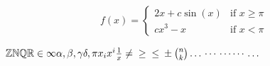 \documentclass{article}
\begin{document}
  \begin{equation}
    f(x) = \begin{cases}
    2x+c\sin(x) & \mbox{if } x\geq\pi \\
    cx^3-x & \mbox{if } x<\pi
    \end{cases}
    \end{equation}


$
\mathbb{Z}\\
\mathbb{N}\\
\mathbb{Q}\\
\mathbb{R}\\
\in\\
\infty\\
\alpha, \beta, \gamma\\
\delta, \pi\\
x_i\\
x^i\\
\frac{1}{x}\\
\neq\\
\geq\\
\leq\\
\pm\\
\binom{n}{k}\\
\dotsc\\
\dotsb\\
\dotsm\\
\dotsi\\
\dotso\\
$
\end{document}

